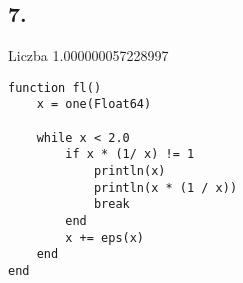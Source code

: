 \documentclass{article}[13pt]
\begin{document}
    \subsection*{7.}

    Liczba 1.000000057228997

\begin{lstlisting}
function fl()
    x = one(Float64)

    while x < 2.0
        if x * (1/ x) != 1
            println(x)
            println(x * (1 / x))
            break
        end
        x += eps(x)
    end
end
\end{lstlisting}
\end{document}
